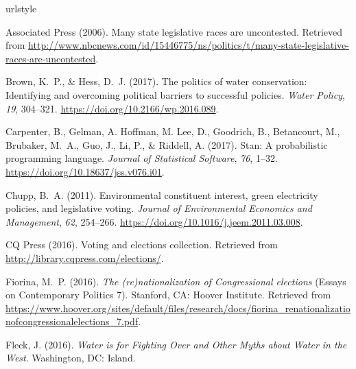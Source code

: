 \documentclass[draft]{agujournal}\usepackage{knitr}
\begin{document}
%
\fi
%
%
%
\begin{thebibliography}{33}
\providecommand{\natexlab}[1]{#1}
\expandafter\ifx\csname urlstyle\endcsname\relax
  \providecommand{\doi}[1]{doi:\discretionary{}{}{}#1}\else
  \providecommand{\doi}{doi:\discretionary{}{}{}\begingroup
  \urlstyle{rm}\Url}\fi


  Associated Press (2006).
  Many state legislative races are uncontested.
  Retrieved from
  \url{http://www.nbcnews.com/id/15446775/ns/politics/t/many-state-legislative-races-are-uncontested}.

  Brown, K.~P., \& Hess, D.~J. (2017).
  The politics of water conservation:
  Identifying and overcoming political barriers to successful policies.
  \textit{Water Policy}, \textit{19}, 304--321.
  \url{https://doi.org/10.2166/wp.2016.089}.

  Carpenter, B., Gelman, A. Hoffman, M. Lee, D., Goodrich, B., Betancourt, M.,
  Brubaker, M.~A., Guo, J., Li, P., \& Riddell, A. (2017).
  Stan: A probabilistic programming language.
  \textit{Journal of Statistical Software}, \textit{76}, 1--32.
  \url{https://doi.org/10.18637/jss.v076.i01}.

  Chupp, B.~A. (2011).
  Environmental constituent interest, green electricity policies, and legislative voting.
  \textit{Journal of Environmental Economics and Management}, \textit{62}, 254--266.
  \url{https://doi.org/10.1016/j.jeem.2011.03.008}.

{CQ Press} (2016).
  Voting and elections collection.
  Retrieved from
  \url{http://library.cqpress.com/elections/}.

  Fiorina, M.~P. (2016).
  \textit{The (re)nationalization of {C}ongressional elections\/}
  (Essays on Contemporary Politics 7).
  Stanford, CA: Hoover Institute.
  Retrieved from
  \url{https://www.hoover.org/sites/default/files/research/docs/fiorina_renationalizationofcongressionalelections_7.pdf}.

  Fleck, J. (2016).
  \textit{Water is for Fighting Over and Other Myths about Water in the West}.
  Washington, DC: Island.


\end{thebibliography}
\end{document}
